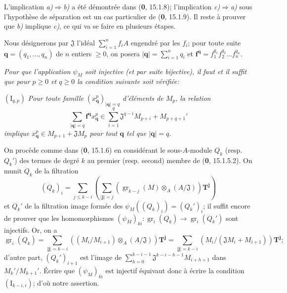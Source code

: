 L'implication \emph{a)}$\Rightarrow$\emph{b)} a été démontrée dans (\textbf{0}, 15.1.8); l'implication \emph{c)}$\Rightarrow$\emph{a)} sous l'hypothèse de séparation est un cas particulier de (\textbf{0}, 15.1.9). Il reste à prouver que \emph{b)} implique \emph{c)}, ce qui va se faire en plusieurs étapes.

Nous désignerons par $\mathfrak J$ l'idéal $\sum_{i=1}^n f_iA$ engendré par les $f_i$; pour toute suite $\mathbf q=(q_1,\ldots,q_n)$ de $n$ entiers $\geq0$, on posera $|\mathbf q|=\sum_{i=1}^nq_i$ et $\mathbf f^{\mathbf q}=f_1^{q_1}f_2^{q_2}\ldots f_n^{q_n}$.

\begin{env}[19.5.5.1]
\label{IV.19.5.5.1}
\emph{Pour que l'application $\psi_M$ soit injective (et par suite bijective), il faut et il suffit que pour $p\geq0$ et $q\geq0$ la condition suivante soit vérifiée:}

$(\mathrm I_{q,p})$ \emph{Pour toute famille $(x_{\mathbf q}^p)_{|\mathbf q|=q}$ d'éléments de $M_p$, la relation}
\[
  \sum_{|\mathbf q|=q}\mathbf f^{\mathbf q}x_{\mathbf q}^p\in\sum_{i=1}^q\mathfrak J^{q-i}M_{p+i}+M_{p+q+1}'
\]
\emph{implique $x_{\mathbf q}^p\in M_{p+1}+\mathfrak JM_p$ pour tout $\mathbf q$ tel que $|\mathbf q|=q$.}

On procède comme dans (\textbf{0}, 15.1.6) en considérant le sous-$A$-module $Q_k$ (resp. $Q_k'$) des termes de degré $k$ au premier (resp. second) membre de (\textbf{0}, 15.1.5.2). On munit $Q_k$ de la filtration
\[
  (Q_k)_i=\sum_{j\leq k-i}\left(\sum_{|\mathbf j|=j}(\operatorname{gr}_{k-j}(M)\otimes_A(A/\mathfrak J))\mathbf T^{\mathbf j}\right)
\]
et $Q_k'$ de la filtration image formée des $\psi_M((Q_k)_i)=(Q_k')_i$; il suffit encore de prouver que les homomorphismes $(\psi_M)_{ki}:\operatorname{gr}_i(Q_k)\to\operatorname{gr}_i(Q_k')$ sont injectifs. Or, on a
\[
  \operatorname{gr}_i(Q_k)=\sum_{|\mathbf j|=k-i}((M_i/M_{i+1})\otimes_A(A/\mathfrak J))\mathbf T^{\mathbf j}
  =\sum_{|\mathbf j|=k-i}(M_i/(\mathfrak JM_i+M_{i+1}))\mathbf T^{\mathbf j};
\]
d'autre part, $(Q_k')_{i+1}$ est l'image de $\sum_{h=0}^{k-i-1}\mathfrak J^{k-i-h-1}M_{i+h+1}$ dans $M_k'/M_{k+1}'$. Écrire que $(\psi_M)_{ki}$ est injectif équivaut donc à écrire la condition $(\mathrm I_{k-i,i})$; d'où notre assertion.
\end{env}

